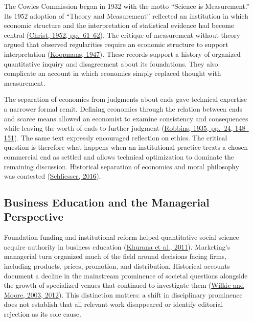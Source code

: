 \noindent The Cowles Commission began in 1932 with the motto ``Science is
Measurement.'' Its 1952 adoption of ``Theory and Measurement'' reflected
an institution in which economic structure and the interpretation of
statistical evidence had become central
(\href{https://cowles.yale.edu/sites/default/files/2022-08/history-cowles.pdf}{Christ,
1952, pp.~61--62}). The critique of measurement without theory argued
that observed regularities require an economic structure to support
interpretation
(\href{https://fairmodel.econ.yale.edu/ec439/koop1.pdf}{Koopmans,
1947}). These records support a history of organized quantitative
inquiry and disagreement about its foundations. They also complicate an
account in which economics simply replaced thought with measurement.

The separation of economics from judgments about ends gave technical
expertise a narrower formal remit. Defining economics through the
relation between ends and scarce means allowed an economist to examine
consistency and consequences while leaving the worth of ends to further
judgment
(\href{https://milescorak.com/wp-content/uploads/2020/02/robbins-essay-nature-significance-economic-science.pdf}{Robbins,
1935, pp.~24, 148--151}). The same text expressly encouraged reflection
on ethics. The critical question is therefore what happens when an
institutional practice treats a chosen commercial end as settled and
allows technical optimization to dominate the remaining discussion.
Historical separation of economics and moral philosophy was contested
(\href{https://doi.org/10.1093/acprof:oso/9780198701392.003.0008}{Schliesser,
2016}).

\hypertarget{M09-business-education-and-the-managerial-perspective}{%
\subsection{Business Education and the Managerial
Perspective}\label{M09-business-education-and-the-managerial-perspective}}

\noindent Foundation funding and institutional reform helped quantitative social
science acquire authority in business education
(\href{https://www.hbs.edu/ris/Publication\%20Files/11-070.pdf}{Khurana
et al., 2011}). Marketing's managerial turn organized much of the field
around decisions facing firms, including products, prices, promotion,
and distribution. Historical accounts document a decline in the
mainstream prominence of societal questions alongside the growth of
specialized venues that continued to investigate them
(\href{https://link.springer.com/article/10.1007/s11747-011-0277-y}{Wilkie
and Moore, 2003, 2012}). This distinction matters: a shift in
disciplinary prominence does not establish that all relevant work
disappeared or identify editorial rejection as its sole cause.

